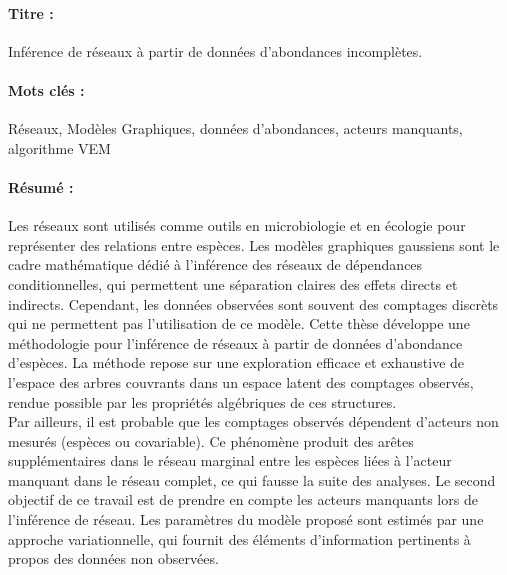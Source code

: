 \begin{mdframed}[linecolor=Prune,linewidth=1]
\vspace{-.25cm}
\paragraph*{Titre :} Inférence de réseaux à partir de données d'abondances incomplètes.
\begin{small}
\vspace{-.25cm}
\paragraph*{Mots clés :} Réseaux, Modèles Graphiques, données d'abondances, acteurs manquants, algorithme VEM
\vspace{-.5cm}
\begin{multicols}{2}
\paragraph*{Résumé :}  

Les réseaux sont utilisés comme outils en microbiologie et en écologie pour représenter des relations entre espèces. Les modèles graphiques gaussiens sont le cadre mathématique dédié à l'inférence des réseaux de dépendances conditionnelles, qui permettent une séparation claires des effets directs et indirects. Cependant, les données observées sont souvent des comptages discrèts qui ne permettent pas l'utilisation de ce modèle. Cette thèse développe une méthodologie pour l'inférence de réseaux à partir de données d'abondance d'espèces. La méthode repose sur une exploration efficace et exhaustive de l'espace des arbres couvrants dans un espace latent des comptages observés, rendue possible par les propriétés algébriques de ces structures.\\
Par ailleurs,  il est probable que les comptages observés dépendent d'acteurs non mesurés (espèces ou covariable).  Ce phénomène produit des arêtes supplémentaires dans le réseau marginal entre les espèces liées à l'acteur manquant dans le réseau complet, ce qui fausse la suite des analyses. Le second objectif de ce travail est de prendre en compte les acteurs manquants lors de l'inférence de réseau. Les paramètres du modèle proposé sont estimés par une approche variationnelle, qui fournit des éléments d'information pertinents à propos des données non observées.

\end{multicols}
\end{small}
\end{mdframed}

